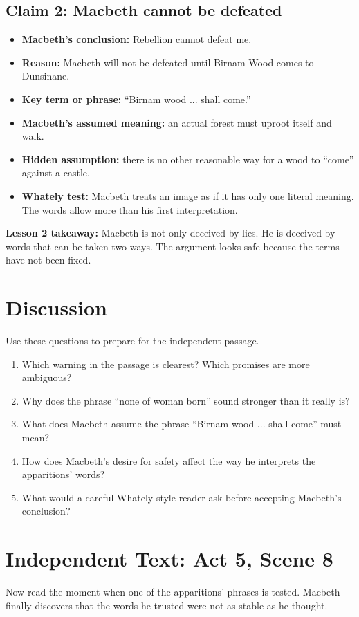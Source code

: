 \documentclass[12pt]{article}
\newcommand{\focusbox}[1]{\par\vspace{0.35em}\noindent\begingroup\setlength{\fboxsep}{6pt}\colorbox{gray!12}{\begin{minipage}{\dimexpr\linewidth-2\fboxsep\relax}#1\end{minipage}}\endgroup\par\vspace{0.45em}}
\begin{document}
\subsection*{Claim 2: Macbeth cannot be defeated}
\begin{itemize}[leftmargin=*]
\item \textbf{Macbeth's conclusion:} Rebellion cannot defeat me.
\item \textbf{Reason:} Macbeth will not be defeated until Birnam Wood comes to Dunsinane.
\item \textbf{Key term or phrase:} ``Birnam wood ... shall come.''
\item \textbf{Macbeth's assumed meaning:} an actual forest must uproot itself and walk.
\item \textbf{Hidden assumption:} there is no other reasonable way for a wood to ``come'' against a castle.
\item \textbf{Whately test:} Macbeth treats an image as if it has only one literal meaning. The words allow more than his first interpretation.
\end{itemize}

\focusbox{\textbf{Lesson 2 takeaway:} Macbeth is not only deceived by lies. He is deceived by words that can be taken two ways. The argument looks safe because the terms have not been fixed.}

\section*{Discussion}
Use these questions to prepare for the independent passage.

\begin{enumerate}[leftmargin=*]
\item Which warning in the passage is clearest? Which promises are more ambiguous?
\item Why does the phrase ``none of woman born'' sound stronger than it really is?
\item What does Macbeth assume the phrase ``Birnam wood ... shall come'' must mean?
\item How does Macbeth's desire for safety affect the way he interprets the apparitions' words?
\item What would a careful Whately-style reader ask before accepting Macbeth's conclusion?
\end{enumerate}

\section*{Independent Text: Act 5, Scene 8}
Now read the moment when one of the apparitions' phrases is tested. Macbeth finally discovers that the words he trusted were not as stable as he thought.
\end{document}
